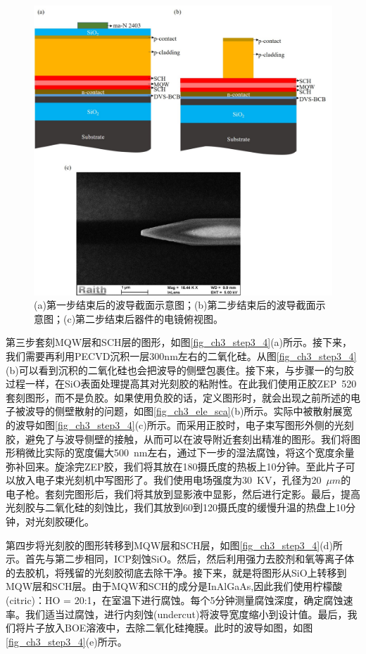 \begin{figure}[htb]
	\centering
	\includegraphics[width=14cm]{./Pictures/fig_ch3_step1_2.jpg}
	\caption{(a)第一步结束后的波导截面示意图；(b)第二步结束后的波导截面示意图；(c)第二步结束后器件的电镜俯视图。}
	\label{fig_ch3_step1_2}
\end{figure}

第三步套刻MQW层和SCH层的图形，如图\ref{fig_ch3_step3_4}(a)所示。接下来，我们需要再利用PECVD沉积一层300nm左右的二氧化硅。从图\ref{fig_ch3_step3_4}(b)可以看到沉积的二氧化硅也会把波导的侧壁包裹住。接下来，与步骤一的匀胶过程一样，在SiO表面处理提高其对光刻胶的粘附性。在此我们使用正胶ZEP~520套刻图形\cite{ZEP520}，而不是负胶。如果使用负胶的话，定义图形时，就会出现之前所述的电子被波导的侧壁散射的问题，如图\ref{fig_ch3_ele_sca}(b)所示。实际中被散射展宽的波导如图\ref{fig_ch3_step3_4}(c)所示。而采用正胶时，电子束写图形外侧的光刻胶，避免了与波导侧壁的接触，从而可以在波导附近套刻出精准的图形。我们将图形稍微比实际的宽度偏大500~nm左右，通过下一步的湿法腐蚀，将这个宽度余量弥补回来。旋涂完ZEP胶，我们将其放在180摄氏度的热板上10分钟。至此片子可以放入电子束光刻机中写图形了。我们使用电场强度为30~KV，孔径为20~$\mu m$的电子枪。套刻完图形后，我们将其放到显影液中显影，然后进行定影。最后，提高光刻胶与二氧化硅的刻蚀比，我们其放到60到120摄氏度的缓慢升温的热盘上10分钟，对光刻胶硬化。

第四步将光刻胶的图形转移到MQW层和SCH层，如图\ref{fig_ch3_step3_4}(d)所示。首先与第二步相同，ICP刻蚀SiO。然后，然后利用强力去胶剂和氧等离子体的去胶机，将残留的光刻胶彻底去除干净。接下来，就是将图形从SiO上转移到MQW层和SCH层。由于MQW和SCH的成分是InAlGaAs,因此我们使用柠檬酸(citric)：HO = 20:1，在室温下进行腐蚀。每个5分钟测量腐蚀深度，确定腐蚀速率。我们适当过腐蚀，进行内刻蚀(undercut)将波导宽度缩小到设计值。最后，我们将片子放入BOE溶液中，去除二氧化硅掩膜。此时的波导如图，如图\ref{fig_ch3_step3_4}(e)所示。

